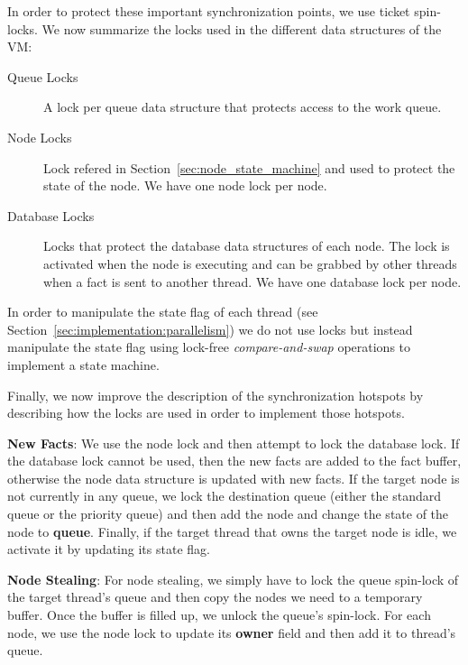In order to protect these important synchronization points, we use ticket spin-locks.
We now summarize the locks used in the different data structures of the VM:

\begin{description}
   \item[Queue Locks] A lock per queue data structure that protects access to
      the work queue.
   \item[Node Locks] Lock refered in Section~\ref{sec:node_state_machine} and used to protect the state of the node. We have one node lock per node.
   \item[Database Locks] Locks that protect the database data structures of each node. The lock is activated when the node is executing and can be grabbed by other threads when a fact is sent to another thread. We have one database lock per node.
\end{description}

In order to manipulate the state flag of each thread (see Section~\ref{sec:implementation:parallelism}) we do not use locks but instead manipulate the state flag using lock-free \emph{compare-and-swap} operations to implement a state machine.

Finally, we now improve the description of the synchronization hotspots by describing how the locks are used in order to implement those hotspots.

\begin{description}
\item \textbf{New Facts}: We use the node lock and then attempt to lock the database lock. If the database lock cannot be used, then the new facts are added to the fact buffer, otherwise the node data structure is updated with new facts. If the target node is not currently in any queue, we lock the destination queue (either the standard queue or the priority queue) and then add the node and change the state of the node to \textbf{queue}. Finally, if the target thread that owns the target node is idle, we activate it by updating its state flag.
\item \textbf{Node Stealing}: For node stealing, we simply have to lock the queue spin-lock of the target thread's queue and then copy the nodes we need to a temporary buffer. Once the buffer is filled up, we unlock the queue's spin-lock. For each node, we use the node lock to update its \textbf{owner} field and then add it to thread's queue.
\end{description}
